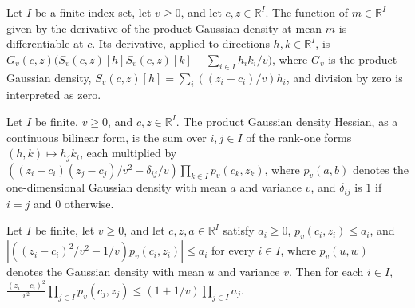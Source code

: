 \begin{lemma}
\leanok
{}
Let $I$ be a finite index set, let $v\ge0$, and let $c,z\in\mathbb R^I$. The function of
$m\in\mathbb R^I$ given by the derivative of the product Gaussian density at mean $m$ is
differentiable at $c$. Its derivative, applied to directions $h,k\in\mathbb R^I$, is
$G_v(c,z)\bigl(S_v(c,z)[h]S_v(c,z)[k]-\sum_{i\in I}h_i k_i/v\bigr)$, where $G_v$ is the
product Gaussian density, $S_v(c,z)[h]=\sum_i((z_i-c_i)/v)h_i$, and division by zero is
interpreted as zero.
\end{lemma}

\begin{lemma}
\leanok
{}
Let $I$ be finite, $v\ge0$, and $c,z\in\mathbb R^I$. The product Gaussian density
Hessian, as a continuous bilinear form, is the sum over $i,j\in I$ of the rank-one forms
$(h,k)\mapsto h_jk_i$, each multiplied by
$\left((z_i-c_i)(z_j-c_j)/v^2-\delta_{ij}/v\right)\prod_{k\in I}p_v(c_k,z_k)$, where
$p_v(a,b)$ denotes the one-dimensional Gaussian density with mean $a$ and variance $v$,
and $\delta_{ij}$ is $1$ if $i=j$ and $0$ otherwise.
\end{lemma}

\begin{lemma}
\leanok
{}
Let $I$ be finite, let $v\ge0$, and let $c,z,a\in\mathbb R^I$ satisfy $a_i\ge0$,
$p_v(c_i,z_i)\le a_i$, and $\left|\left((z_i-c_i)^2/v^2-1/v\right)p_v(c_i,z_i)\right|\le
a_i$ for every $i\in I$, where $p_v(u,w)$ denotes the Gaussian density with mean $u$ and
variance $v$. Then for each $i\in I$, $\frac{(z_i-c_i)^2}{v^2}\prod_{j\in
I}p_v(c_j,z_j)\le(1+1/v)\prod_{j\in I}a_j$.
\end{lemma}

